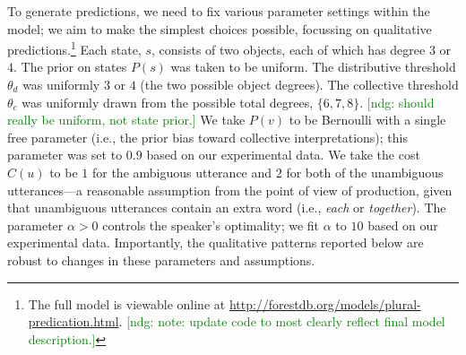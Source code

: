 \documentclass[preprint,12pt,authoryear,titlepage]{elsarticle}
\newcommand{\ndg}[1]{\textcolor{Green}{[ndg: #1]}}
\begin{document}

To generate predictions, we need to fix various parameter settings within the model; we aim to make the simplest choices possible, focussing on qualitative predictions.\footnote{The full model is viewable online at \url{http://forestdb.org/models/plural-predication.html}. \ndg{note: update code to most clearly reflect final model description.}}
Each state, $s$, consists of two objects, each of which has degree $3$ or $4$. The prior on states $P(s)$ was taken to be uniform. The distributive threshold $\theta_d$ was uniformly $3$ or $4$ (the two possible object degrees). The collective threshold $\theta_c$ was uniformly drawn from the possible total degrees, $\{6,7,8\}$. \ndg{should really be uniform, not state prior.}
We take $P(v)$ to be Bernoulli with a single free parameter (i.e., the prior bias toward collective interpretations); this parameter was set to $0.9$ based on our experimental data.
We take the cost $C(u)$ to be $1$ for the ambiguous utterance and $2$ for both of the unambiguous utterances---a reasonable assumption from the point of view of production, given that unambiguous utterances contain an extra word (i.e., \emph{each} or \emph{together}). The parameter $\alpha > 0$ controls the speaker's optimality; we fit $\alpha$ to $10$ based on our experimental data.
Importantly, the qualitative patterns reported below are robust to changes in these parameters and assumptions.


\end{document}
